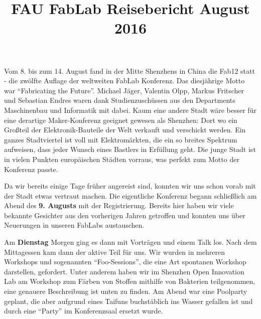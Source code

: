 \documentclass{\basedir/fablab-document}
\title{FAU FabLab Reisebericht August 2016}
\begin{document}
\begin{figure}[htb]
	\noindent{}
\end{figure}

\section*{}

Vom 8. bis zum 14. August fand in der Mitte Shenzhens in China die Fab12
statt - die zwölfte Auflage der weltweiten FabLab Konferenz. Das
diesjährige Motto war \enquote{Fabricating the Future}. Michael Jäger,
Valentin Olpp, Markus Fritscher und Sebastian Endres waren dank
Studienzuschüssen aus den Departments Maschinenbau und Informatik mit
dabei. Kaum eine andere Stadt wäre besser für eine derartige
Maker-Konferenz geeignet gewesen als Shenzhen: Dort wo ein Großteil der
Elektronik-Bauteile der Welt verkauft und verschickt werden. Ein ganzes
Stadtviertel ist voll mit Elektromärkten, die ein so breites Spektrum
aufweisen, dass jeder Wunsch eines Bastlers in Erfüllung geht. Die junge
Stadt ist in vielen Punkten europäischen Städten vorraus, was perfekt
zum Motto der Konferenz passte.

Da wir bereits einige Tage früher angereist sind, konnten wir uns schon
vorab mit der Stadt etwas vertraut machen. Die eigentliche Konferenz
begann schließlich am Abend des \textbf{9. Augusts} mit der
Registrierung. Bereits hier haben wir viele bekannte Gesichter aus den
vorherigen Jahren getroffen und konnten uns über Neuerungen in unseren
FabLabs austauschen.

Am \textbf{Dienstag} Morgen ging es dann mit Vorträgen und einem Talk
los. Nach dem Mittagessen kam dann der aktive Teil für uns. Wir wurden
in mehreren Workshops und sogenannten \enquote{Foo-Sessions}, die eine Art
spontanen Workshop darstellen, gefordert. Unter anderem haben wir im
Shenzhen Open Innovation Lab am Workshop zum Färben von Stoffen mithilfe
von Bakterien teilgenommen, eine genauere Beschreibung ist unten zu
finden. Am Abend war eine Poolparty geplant, die aber aufgrund eines
Taifuns buchstäblich ins Wasser gefallen ist und durch eine \enquote{Party} im
Konferenzsaal ersetzt wurde.
\end{document}
